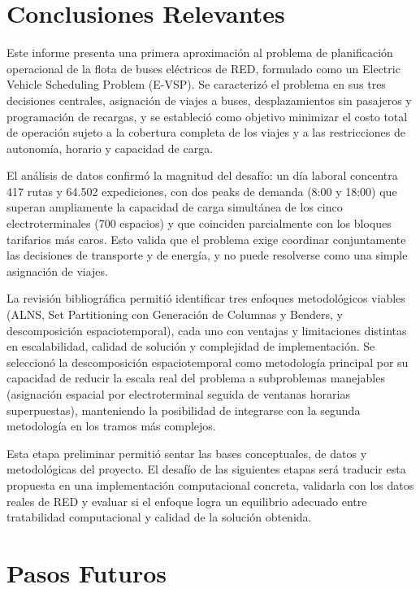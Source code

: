 \section{Conclusiones Relevantes \label{sec:conclusionesrelevantes}}

Este informe presenta una primera aproximaci\'on al problema de planificaci\'on operacional de la flota de buses el\'ectricos de RED, formulado como un Electric Vehicle Scheduling Problem (E-VSP). Se caracteriz\'o el problema en sus tres decisiones centrales, asignaci\'on de viajes a buses, desplazamientos sin pasajeros y programaci\'on de recargas, y se estableci\'o como objetivo minimizar el costo total de operaci\'on sujeto a la cobertura completa de los viajes y a las restricciones de autonom\'ia, horario y capacidad de carga.

El an\'alisis de datos confirm\'o la magnitud del desaf\'io: un d\'ia laboral concentra 417 rutas y 64.502 expediciones, con dos peaks de demanda (8:00 y 18:00) que superan ampliamente la capacidad de carga simult\'anea de los cinco electroterminales (700 espacios) y que coinciden parcialmente con los bloques tarifarios m\'as caros. Esto valida que el problema exige coordinar conjuntamente las decisiones de transporte y de energ\'ia, y no puede resolverse como una simple asignaci\'on de viajes.

La revisi\'on bibliogr\'afica permiti\'o identificar tres enfoques metodol\'ogicos viables (ALNS, Set Partitioning con Generaci\'on de Columnas y Benders, y descomposici\'on espaciotemporal), cada uno con ventajas y limitaciones distintas en escalabilidad, calidad de soluci\'on y complejidad de implementaci\'on. Se seleccion\'o la descomposici\'on espaciotemporal como metodolog\'ia principal por su capacidad de reducir la escala real del problema a subproblemas manejables (asignaci\'on espacial por electroterminal seguida de ventanas horarias superpuestas), manteniendo la posibilidad de integrarse con la segunda metodolog\'ia en los tramos m\'as complejos.

Esta etapa preliminar permiti\'o sentar las bases conceptuales, de datos y metodol\'ogicas del proyecto. El desaf\'io de las siguientes etapas ser\'a traducir esta propuesta en una implementaci\'on computacional concreta, validarla con los datos reales de RED y evaluar si el enfoque logra un equilibrio adecuado entre tratabilidad computacional y calidad de la soluci\'on obtenida.

\section{Pasos Futuros \label{sec:pasosfuturos}}

